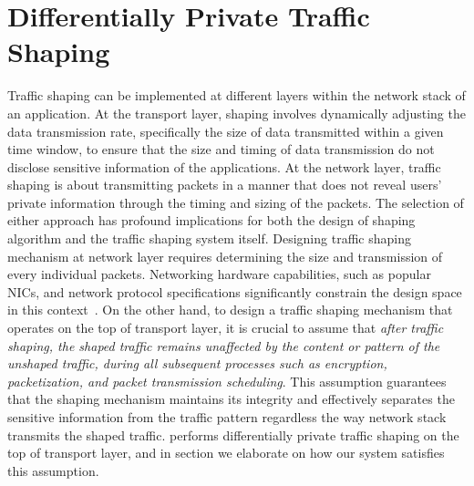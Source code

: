 
\chapter{Differentially Private Traffic Shaping}
\label{ch:dp-shaping}
Traffic shaping can be implemented at different layers within the network stack of an application.
At the transport layer, shaping involves dynamically adjusting the data transmission rate, specifically the size of data transmitted within a given time window, to ensure that the size and timing of data transmission do not disclose sensitive information of the applications.
At the network layer, traffic shaping is about transmitting packets in a manner that does not reveal users' private information through the timing and sizing of the packets. 
The selection of either approach has profound implications for both the design of shaping algorithm and the traffic shaping system itself.
Designing traffic shaping mechanism at network layer requires determining the size and transmission of every individual packets. 
Networking hardware capabilities, such as popular NICs, and network protocol specifications significantly constrain the design space in this context~\cite{mehta2022pacer}.  
On the other hand, to design a traffic shaping mechanism that operates on the top of transport layer, it is crucial to assume that \textit{after traffic shaping, the shaped traffic remains unaffected by the content or pattern of the unshaped traffic, during all subsequent processes such as encryption, packetization, and packet transmission scheduling}.
This assumption guarantees that the shaping mechanism maintains its integrity and effectively separates the sensitive information from the traffic pattern regardless the way network stack transmits the shaped traffic.
{\sys} performs differentially private traffic shaping on the top of transport layer, and in section {\addref} we elaborate on how our system satisfies this assumption.
 
